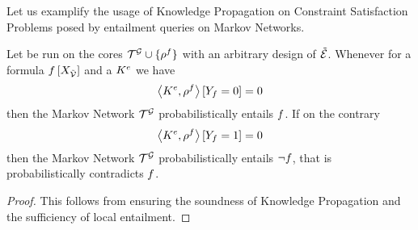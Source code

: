 
Let us examplify the usage of Knowledge Propagation on Constraint Satisfaction Problems posed by entailment queries on Markov Networks.

\begin{corollary}\label{cor:knowledgePropagationMarkovNetworks}
	Let  be run on the cores $\mathcal{T}^{\mathcal{G}}\cup\{\rho^{f}\}$ with an arbitrary design of $\tilde{\mathcal{E}}$.
	Whenever for a formula $f\left[X_{\tilde{\mathcal{V}}}\right]$ and a $K^{e}$ we have
		\[ \left\langle K^{e},\rho^{f}\right\rangle \left[ Y_{f}=0 \right] =0  \]
	then the Markov Network $\mathcal{T}^{\mathcal{G}}$ probabilistically entails $f$.
	If on the contrary
		\[ \left\langle K^{e},\rho^{f}\right\rangle \left[ Y_{f}=1 \right] =0  \]
	then the Markov Network $\mathcal{T}^{\mathcal{G}}$ probabilistically entails $\lnot f$, that is probabilistically contradicts $f$.
\end{corollary}
\begin{proof}
	This follows from  ensuring the soundness of Knowledge Propagation and the sufficiency of local entailment.
\end{proof}

